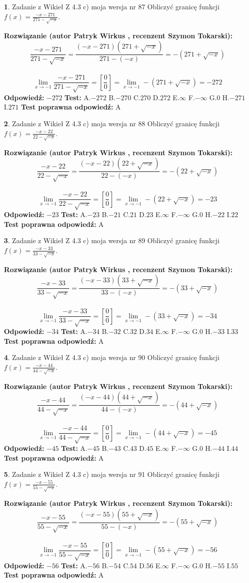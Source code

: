 \documentclass[12pt, a4paper]{article}
\theoremstyle{definition} %
\newtheorem{zad}{}
\newcommand{\zadStart}[1]{\begin{zad}#1\newline}
\newcommand{\zadStop}{\end{zad}}
\newcommand{\rozwStart}[2]{\noindent \textbf{Rozwiązanie (autor #1 , recenzent #2): }\newline}
\newcommand{\rozwStop}{\newline}
\newcommand{\odpStart}{\noindent \textbf{Odpowiedź:}\newline}
\newcommand{\odpStop}{\newline}
\newcommand{\testStart}{\noindent \textbf{Test:}\newline}
\newcommand{\testStop}{\newline}
\newcommand{\kluczStart}{\noindent \textbf{Test poprawna odpowiedź:}\newline}
\newcommand{\kluczStop}{\newline}
\begin{document}
\zadStart{Zadanie z Wikieł Z 4.3 c) moja wersja nr 87}
Obliczyć granicę funkcji $f(x)=\frac{-x-271}{271-\sqrt{-x}}$.
\zadStop
\rozwStart{Patryk Wirkus}{Szymon Tokarski}
$$\frac{-x-271}{271-\sqrt{-x}}=\frac{(-x-271)(271+\sqrt{-x})}{271-(-x)}=-(271+\sqrt{-x})$$
\\
$$\lim\limits_{x\to-1}\frac{-x-271}{271-\sqrt{-x}}=[\frac{0}{0}]=\lim\limits_{x\to-1}-(271+\sqrt{-x}) =-272$$
\rozwStop
\odpStart
$-272$
\odpStop
\testStart
A.$-272$
B.$-270$
C.$270$
D.$272$
E.$\infty$
F.$-\infty$
G.$0$
H.$-271$
I.$271$
\testStop
\kluczStart
A
\kluczStop



\zadStart{Zadanie z Wikieł Z 4.3 c) moja wersja nr 88}
Obliczyć granicę funkcji $f(x)=\frac{-x-22}{22-\sqrt{-x}}$.
\zadStop
\rozwStart{Patryk Wirkus}{Szymon Tokarski}
$$\frac{-x-22}{22-\sqrt{-x}}=\frac{(-x-22)(22+\sqrt{-x})}{22-(-x)}=-(22+\sqrt{-x})$$
\\
$$\lim\limits_{x\to-1}\frac{-x-22}{22-\sqrt{-x}}=[\frac{0}{0}]=\lim\limits_{x\to-1}-(22+\sqrt{-x}) =-23$$
\rozwStop
\odpStart
$-23$
\odpStop
\testStart
A.$-23$
B.$-21$
C.$21$
D.$23$
E.$\infty$
F.$-\infty$
G.$0$
H.$-22$
I.$22$
\testStop
\kluczStart
A
\kluczStop



\zadStart{Zadanie z Wikieł Z 4.3 c) moja wersja nr 89}
Obliczyć granicę funkcji $f(x)=\frac{-x-33}{33-\sqrt{-x}}$.
\zadStop
\rozwStart{Patryk Wirkus}{Szymon Tokarski}
$$\frac{-x-33}{33-\sqrt{-x}}=\frac{(-x-33)(33+\sqrt{-x})}{33-(-x)}=-(33+\sqrt{-x})$$
\\
$$\lim\limits_{x\to-1}\frac{-x-33}{33-\sqrt{-x}}=[\frac{0}{0}]=\lim\limits_{x\to-1}-(33+\sqrt{-x}) =-34$$
\rozwStop
\odpStart
$-34$
\odpStop
\testStart
A.$-34$
B.$-32$
C.$32$
D.$34$
E.$\infty$
F.$-\infty$
G.$0$
H.$-33$
I.$33$
\testStop
\kluczStart
A
\kluczStop



\zadStart{Zadanie z Wikieł Z 4.3 c) moja wersja nr 90}
Obliczyć granicę funkcji $f(x)=\frac{-x-44}{44-\sqrt{-x}}$.
\zadStop
\rozwStart{Patryk Wirkus}{Szymon Tokarski}
$$\frac{-x-44}{44-\sqrt{-x}}=\frac{(-x-44)(44+\sqrt{-x})}{44-(-x)}=-(44+\sqrt{-x})$$
\\
$$\lim\limits_{x\to-1}\frac{-x-44}{44-\sqrt{-x}}=[\frac{0}{0}]=\lim\limits_{x\to-1}-(44+\sqrt{-x}) =-45$$
\rozwStop
\odpStart
$-45$
\odpStop
\testStart
A.$-45$
B.$-43$
C.$43$
D.$45$
E.$\infty$
F.$-\infty$
G.$0$
H.$-44$
I.$44$
\testStop
\kluczStart
A
\kluczStop



\zadStart{Zadanie z Wikieł Z 4.3 c) moja wersja nr 91}
Obliczyć granicę funkcji $f(x)=\frac{-x-55}{55-\sqrt{-x}}$.
\zadStop
\rozwStart{Patryk Wirkus}{Szymon Tokarski}
$$\frac{-x-55}{55-\sqrt{-x}}=\frac{(-x-55)(55+\sqrt{-x})}{55-(-x)}=-(55+\sqrt{-x})$$
\\
$$\lim\limits_{x\to-1}\frac{-x-55}{55-\sqrt{-x}}=[\frac{0}{0}]=\lim\limits_{x\to-1}-(55+\sqrt{-x}) =-56$$
\rozwStop
\odpStart
$-56$
\odpStop
\testStart
A.$-56$
B.$-54$
C.$54$
D.$56$
E.$\infty$
F.$-\infty$
G.$0$
H.$-55$
I.$55$
\testStop
\kluczStart
A
\kluczStop
\end{document}
